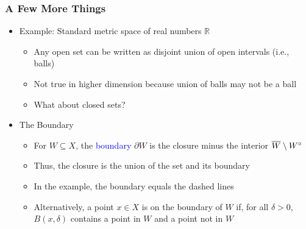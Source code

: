 \documentclass[10pt,english,aspectratio=169]{beamer}
\begin{document}
\begin{frame} \frametitle{A Few More Things}

\begin{itemize}
  \setlength{\itemsep}{4mm}
  \item Example: Standard metric space of real numbers $\mathbb{R}$ \vspace{1mm}
  \begin{itemize}
    \setlength{\itemsep}{2mm}
    \item<1-> Any open set can be written as disjoint union of open intervals (i.e., balls)
    \item Not true in higher dimension because union of balls may not be a ball
    \item What about closed sets?
  \end{itemize}
  
  \item<2-> The Boundary \vspace{1mm}
  \begin{itemize}
    \setlength{\itemsep}{2mm}
    \item For $W \subseteq X$, the \textcolor{blue}{boundary} $\partial W$ is the closure minus the interior $\overline{W} \setminus {W}^{\circ}\!\!\!$
    \item Thus, the closure is the union of the set and its boundary
    \item In the example, the boundary equals the dashed lines
    \item Alternatively, a point $x\in X$ is on the boundary of $W$ if, for all $\delta>0$, $B(x,\delta)$ contains a point in $W$ and a point not in $W$

  \end{itemize}
\end{itemize}


\end{frame}
\end{document}

